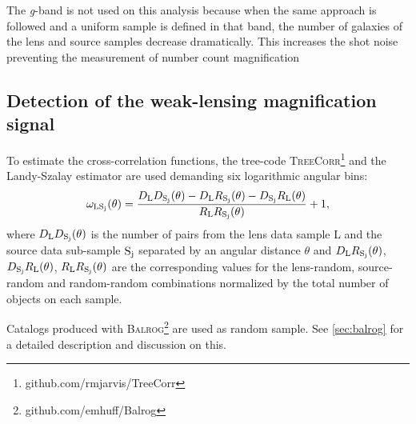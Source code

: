 The {\it g}-band is not used on this analysis because when the same approach is followed and a uniform sample is defined in that band, the number of galaxies of the lens and source samples decrease dramatically. This increases the shot noise preventing the measurement of number count magnification

\subsection{Detection of the weak-lensing magnification signal}
\label{sec:analysis_sv}
To estimate the cross-correlation functions, the tree-code {\scshape TreeCorr}\footnote{github.com/rmjarvis/TreeCorr} \cite{2004MNRAS.352..338J} and the Landy-Szalay estimator \cite{1993ApJ...412...64L} are used demanding six logarithmic angular bins:
\begin{equation}
\omega_{\rm LS_j}(\theta) = \frac{D_{\rm L}D_{\rm S_j}(\theta)-D_{\rm L}R_{\rm S_j}(\theta)-D_{\rm S_j}R_{\rm L}(\theta)}{R_{\rm L}R_{\rm S_j}(\theta)}+1,
\label{eq:landyszalay}
\end{equation}
where $D_{\rm L}D_{\rm S_j}(\theta)$ is the number of pairs from the lens data sample L and the source data sub-sample $\rm S_j$ separated by an angular distance $\theta$ and $D_{\rm L}R_{\rm S_j}(\theta)$, $D_{\rm S_j}R_{\rm L}(\theta)$, $R_{\rm L}R_{\rm S_j}(\theta)$ are the corresponding values for the lens-random, source-random and random-random combinations normalized by the total number of objects on each sample.
\newline

Catalogs produced with {\scshape Balrog}\footnote{github.com/emhuff/Balrog} \cite{2016MNRAS.457..786S} are used as random sample. See \autoref{sec:balrog} for a detailed description and discussion on this.
\newline

